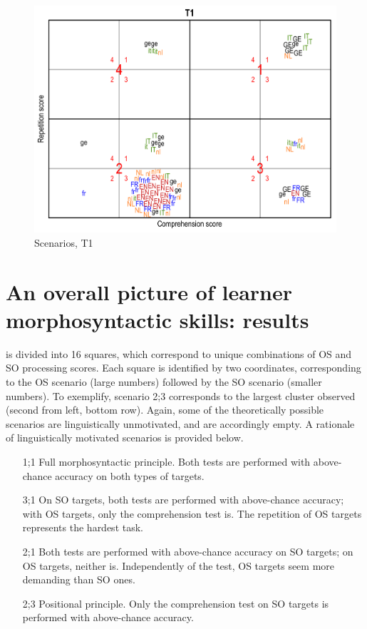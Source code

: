 \begin{figure}
    \includegraphics[width=\textwidth]{figures/06-5.pdf}
    \caption{Scenarios, T1}
    \label{fig:06:5}
\end{figure}

\section{An overall picture of learner morphosyntactic skills: results}\label{sec:06:3}

 is divided into 16 squares, which correspond to unique combinations of OS and SO processing scores. Each square is identified by two coordinates, corresponding to the OS scenario (large numbers) followed by the SO scenario (smaller numbers). To exemplify, scenario 2;3 corresponds to the largest cluster observed (second from left, bottom row). Again, some of the theoretically possible scenarios are linguistically unmotivated, and are accordingly empty. A rationale of linguistically motivated scenarios is provided below.

\begin{itemize}
    \item[1;1] Full morphosyntactic principle. Both tests are performed with above-chance accuracy on both types of targets.
    \item [3;1] On SO targets, both tests are performed with above-chance accuracy; with OS targets, only the comprehension test is. The repetition of OS targets represents the hardest task.
    \item[2;1] Both tests are performed with above-chance accuracy on SO targets; on OS targets, neither is. Independently of the test, OS targets seem more demanding than SO ones.
    \item[2;3] Positional principle. Only the comprehension test on SO targets is performed with above-chance accuracy. 
\end{itemize}

